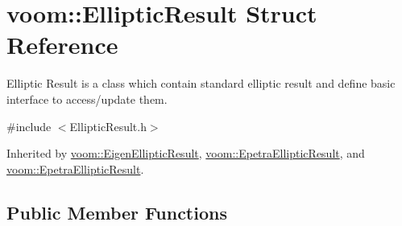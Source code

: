 \hypertarget{structvoom_1_1_elliptic_result}{
\section{voom::EllipticResult Struct Reference}
\label{structvoom_1_1_elliptic_result}
}


Elliptic Result is a class which contain standard elliptic result and define basic interface to access/update them.  


{\ttfamily \#include $<$EllipticResult.h$>$}

Inherited by \hyperlink{structvoom_1_1_eigen_elliptic_result}{voom::EigenEllipticResult}, \hyperlink{structvoom_1_1_epetra_elliptic_result}{voom::EpetraEllipticResult}, and \hyperlink{structvoom_1_1_epetra_elliptic_result}{voom::EpetraEllipticResult}.\subsection*{Public Member Functions}
